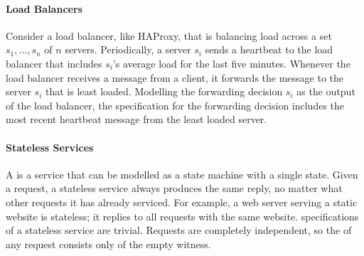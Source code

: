 \paragraph{Load Balancers}
Consider a load balancer, like HAProxy, that is balancing load across a set
$s_1, \ldots, s_n$ of $n$ servers. Periodically, a server $s_i$ sends a
heartbeat to the load balancer that includes $s_i$'s average load for the last
five minutes. Whenever the load balancer receives a message from a client, it
forwards the message to the server $s_i$ that is least loaded. Modelling the
forwarding decision $s_i$ as the output of the load balancer, the
\watprovenance{} specification for the forwarding decision includes the most
recent heartbeat message from the least loaded server.

\paragraph{Stateless Services}
A  is a service that can be modelled as a state
machine with a single state. Given a request, a stateless service always
produces the same reply, no matter what other requests it has already serviced.
For example, a web server serving a static website is stateless; it replies to
all requests with the same website. \Watprovenance{} specifications of a
stateless service are trivial. Requests are completely independent, so the
\watprovenance{} of any request consists only of the empty witness.

